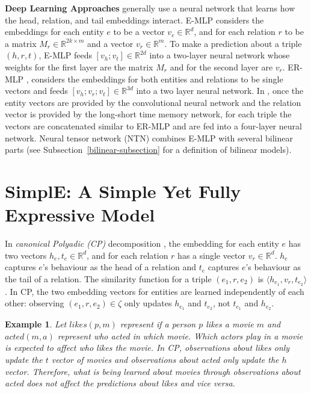 \documentclass{article}
\newcommand{\triple}[3]{(\mathit{#1}, \mathit{#2}, \mathit{#3})}
\newtheorem{exampl}{Example}
\newenvironment{example}{\begin{exampl}\em}{\end{exampl}}
\begin{document}
\textbf{Deep Learning Approaches} generally use a neural network that learns how the head, relation, and tail embeddings interact. 
E-MLP \cite{socher2013reasoning} considers the embeddings for each entity $e$ to be a vector $v_e\in\mathbb{R}^d$, and for each relation $r$ to be a matrix $M_r\in\mathbb{R}^{2k\times m}$ and a vector $v_r\in\mathbb{R}^{m}$. To make a prediction about a triple $\triple{h}{r}{t}$, E-MLP feeds $[v_h;v_t]\in\mathbb{R}^{2d}$ into a two-layer neural network whose weights for the first layer are the matrix $M_r$ and for the second layer are $v_r$. 
ER-MLP \cite{KnowledgeVault}, 
considers the embeddings for both entities and relations to be single vectors and feeds $[v_h;v_r;v_t]\in\mathbb{R}^{3d}$ into a two layer neural network. In \cite{santoro2017simple}, once the entity vectors are provided by the convolutional neural network and the relation vector is provided by the long-short time memory network, for each triple the vectors are concatenated similar to ER-MLP and are fed into a four-layer neural network. Neural tensor network (NTN) \cite{socher2013reasoning} combines E-MLP with several bilinear parts (see Subsection~\ref{bilinear-subsection} for a definition of bilinear models).

\section{SimplE: A Simple Yet Fully Expressive Model}
In \emph{canonical Polyadic (CP)} decomposition \cite{hitchcock1927expression}, the embedding for each entity $e$ has two vectors $h_e,t_e\in\mathbb{R}^d$, and for each relation $r$ has a single vector $v_r\in\mathbb{R}^d$. 
$h_e$ captures $e$'s behaviour as the head of a relation and $t_e$ captures $e$'s behaviour as the tail of a relation.
The similarity function for a triple $\triple{e_1}{r}{e_2}$ is $\langle h_{e_1}, v_r, t_{e_2} \rangle$. 
In CP, the two embedding vectors for entities are learned independently of each other: observing $\triple{e_1}{r}{e_2} \in \zeta$ only updates $h_{e_1}$ and $t_{e_2}$, not $t_{e_1}$ and $h_{e_2}$.

\begin{example}
Let $likes(p, m)$ represent if a person $p$ likes a movie $m$ and $acted(m, a)$ represent who acted in which movie. Which actors play in a movie is expected to affect who likes the movie. In CP, observations about \emph{likes} only update the $t$ vector of movies and observations about \emph{acted} only update the $h$ vector. Therefore, what is being learned about movies through observations about \emph{acted} does not affect the predictions about \emph{likes} and vice versa. 
\end{example}
\end{document}
